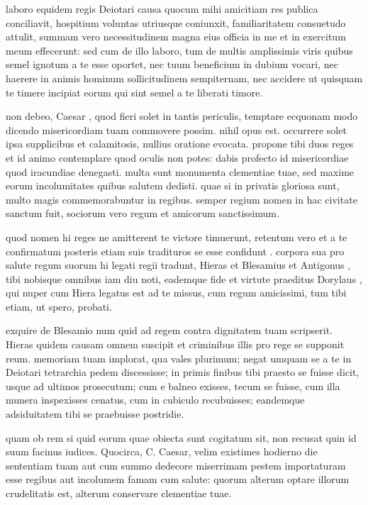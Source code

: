  laboro equidem regis Deiotari causa quocum mihi amicitiam res publica conciliavit, hospitium voluntas utriusque coniunxit, familiaritatem consuetudo attulit, summam vero necessitudinem magna eius officia in me et in exercitum meum effecerunt: sed cum de illo laboro, tum de multis amplissimis viris quibus semel ignotum a te esse oportet, nec tuum beneficium in dubium vocari, nec haerere in animis hominum sollicitudinem sempiternam, nec accidere ut quisquam te timere incipiat eorum qui sint semel a te liberati timore.

 non debeo, Caesar , quod fieri solet in tantis periculis, temptare ecquonam modo dicendo misericordiam tuam commovere possim. nihil opus est. occurrere solet ipsa supplicibus et calamitosis, nullius oratione evocata. propone tibi duos reges et id animo contemplare quod oculis non potes: dabis profecto id misericordiae quod iracundiae denegasti. multa sunt monumenta clementiae tuae, sed maxime eorum incolumitates quibus salutem dedisti. quae si in privatis gloriosa sunt, multo magis commemorabuntur in regibus. semper regium nomen in hac civitate sanctum fuit, sociorum vero regum et amicorum sanctissimum.

 quod nomen hi reges ne amitterent te victore timuerunt, retentum vero et a te confirmatum posteris etiam suis tradituros se esse confidunt . corpora sua pro salute regum suorum hi legati regii tradunt, Hieras et Blesamius et Antigonus , tibi nobisque omnibus iam diu noti, eademque fide et virtute praeditus Dorylaus , qui nuper cum Hiera legatus est ad te missus, cum regum amicissimi, tum tibi etiam, ut spero, probati.

 exquire de Blesamio num quid ad regem contra dignitatem tuam scripserit. Hieras quidem causam omnem suscipit et criminibus illis pro rege se supponit reum. memoriam tuam implorat, qua vales plurimum; negat umquam se a te in Deiotari tetrarchia pedem discessisse; in primis finibus tibi praesto se fuisse dicit, usque ad ultimos prosecutum; cum e balneo exisses, tecum se fuisse, cum illa munera inspexisses cenatus, cum in cubiculo recubuisses; eandemque adsiduitatem tibi se praebuisse postridie.

 quam ob rem si quid eorum quae obiecta sunt cogitatum sit, non recusat quin id suum facinus iudices. Quocirca, C. Caesar, velim existimes hodierno die sententiam tuam aut cum summo dedecore miserrimam pestem importaturam esse regibus aut incolumem famam cum salute: quorum alterum optare illorum crudelitatis est, alterum conservare clementiae tuae.
